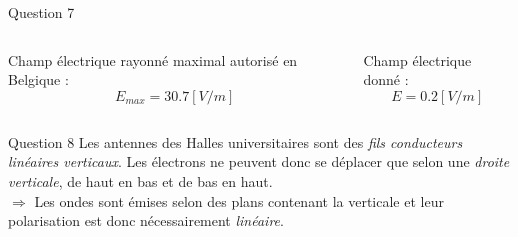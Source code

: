 \documentclass{beamer}
\begin{document}
\begin{frame}{Question 7}
	\begin{columns}
		\begin{column}{0.40\textwidth}
			\begin{center}
			Champ électrique rayonné maximal autorisé en Belgique  : 
			$$E_{max} = 30.7 [V/m] $$
	    		
        		\end{center}
        	\end{column}
        	\begin{column}{0.40\textwidth}
			\begin{center}
	    Champ électrique donné : 
	    $$ E = 0.2 [V/m]$$
	    
        	\end{center}
        	\end{column}
        	\end{columns}
        	        	
\end{frame}

\begin{frame}{Question 8}
    Les antennes des Halles universitaires sont des \emph{fils conducteurs linéaires verticaux}. Les électrons ne peuvent donc se déplacer que selon une \emph{droite verticale}, de haut en bas et de bas en haut.\\[0.5em]
    
    $\Rightarrow$ Les ondes sont émises selon des plans contenant la verticale et leur polarisation est donc nécessairement \emph{linéaire}.
\end{frame}
\end{document}
